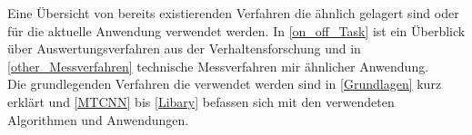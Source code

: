 Eine Übersicht von bereits existierenden Verfahren die ähnlich gelagert sind oder für die aktuelle Anwendung verwendet werden. In \autoref{on_off_Task} ist ein Überblick über Auswertungsverfahren aus der Verhaltensforschung und in \autoref{other_Messverfahren} technische Messverfahren mir ähnlicher Anwendung.\\
Die grundlegenden Verfahren die verwendet werden sind in \autoref{Grundlagen} kurz erklärt und \autoref{MTCNN} bis \autoref{Libary} befassen sich mit den verwendeten Algorithmen und Anwendungen.
